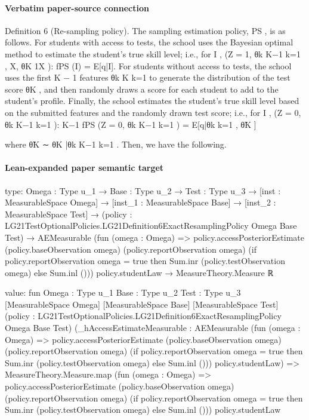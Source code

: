 \documentclass[10pt]{article}
\begin{document}
\paragraph{Verbatim paper-source connection}
\begin{ReviewVerbatim}
Definition 6 (Re-sampling policy). The sampling estimation policy, PS , is as follows.
For students with access to tests, the school uses the Bayesian optimal method to estimate the
student’s true skill level; i.e., for I , (Z = 1, {θk }K−1
k=1 , X, θK 1X ):
fPS (I) = E[q|I].
For students without access to tests, the school uses the first K − 1 features {θk }K
k=1 to generate
the distribution of the test score θK , and then randomly draws a score for each student to add to the
student’s profile. Finally, the school estimates the student’s true skill level based on the submitted
features and the randomly drawn test score; i.e., for I , (Z = 0, {θk }K−1
k=1 ):
K−1
fPS (Z = 0, {θk }K−1
k=1 ) = E[q|{θk }k=1 , θ̃K ]

where
θ̃K ∼ θK |{θk }K−1
k=1 .
Then, we have the following.
\end{ReviewVerbatim}



\paragraph{Lean-expanded paper semantic target}
\begin{ReviewVerbatim}
type:
{Omega : Type u_1} →
  {Base : Type u_2} →
    {Test : Type u_3} →
      [inst : MeasurableSpace Omega] →
        [inst_1 : MeasurableSpace Base] →
          [inst_2 : MeasurableSpace Test] →
            (policy : LG21TestOptionalPolicies.LG21Definition6ExactResamplingPolicy Omega Base Test) →
              AEMeasurable
                  (fun (omega : Omega) =>
                    policy.accessPosteriorEstimate (policy.baseObservation omega) (policy.reportObservation omega)
                      (if policy.reportObservation omega = true then Sum.inr (policy.testObservation omega)
                      else Sum.inl ()))
                  policy.studentLaw →
                MeasureTheory.Measure ℝ

value:
fun {Omega : Type u_1} {Base : Type u_2} {Test : Type u_3} [MeasurableSpace Omega] [MeasurableSpace Base]
    [MeasurableSpace Test] (policy : LG21TestOptionalPolicies.LG21Definition6ExactResamplingPolicy Omega Base Test)
    (_hAccessEstimateMeasurable :
      AEMeasurable
        (fun (omega : Omega) =>
          policy.accessPosteriorEstimate (policy.baseObservation omega) (policy.reportObservation omega)
            (if policy.reportObservation omega = true then Sum.inr (policy.testObservation omega) else Sum.inl ()))
        policy.studentLaw) =>
  MeasureTheory.Measure.map
    (fun (omega : Omega) =>
      policy.accessPosteriorEstimate (policy.baseObservation omega) (policy.reportObservation omega)
        (if policy.reportObservation omega = true then Sum.inr (policy.testObservation omega) else Sum.inl ()))
    policy.studentLaw
\end{ReviewVerbatim}
\end{document}
